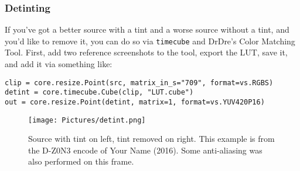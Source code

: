 \documentclass{scrartcl}
\begin{document}
\pagebreak
\subsubsection{Detinting}

If you've got a better source with a tint and a worse source without a tint, and you'd like to remove it, you can do so via \texttt{timecube} and DrDre’s Color Matching Tool.  First, add two reference screenshots to the tool, export the LUT, save it, and add it via something like:
\begin{lstlisting}
clip = core.resize.Point(src, matrix_in_s="709", format=vs.RGBS)
detint = core.timecube.Cube(clip, "LUT.cube")
out = core.resize.Point(detint, matrix=1, format=vs.YUV420P16)
\end{lstlisting}
\begin{figure}[h]
\centering
\texttt{[image: Pictures/detint.png]}
\caption{Source with tint on left, tint removed on right.  This example is from the D-Z0N3 encode of Your Name (2016).  Some anti-aliasing was also performed on this frame.}\label{fig:8}
\end{figure}
\end{document}
